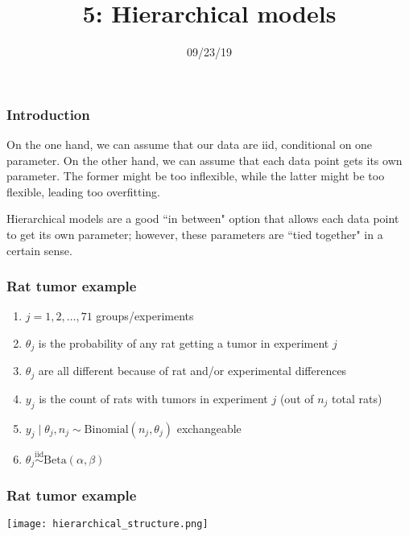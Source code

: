 \documentclass{beamer}
\title["5"]{5: Hierarchical models}
\date{09/23/19}
\begin{document}

\begin{frame}
\titlepage 
\end{frame}

\begin{frame}
\frametitle{Introduction}

On the one hand, we can assume that our data are iid, conditional on one parameter. On the other hand, we can assume that each data point gets its own parameter. The former might be too inflexible, while the latter might be too flexible, leading too overfitting.
\newline

Hierarchical models are a good ``in between" option that allows each data point to get its own parameter; however, these parameters are ``tied together" in a certain sense.

\end{frame}

\begin{frame}
\frametitle{Rat tumor example}

\begin{enumerate}
\item $j=1,2,\ldots,71$ groups/experiments
\item $\theta_j$ is the probability of any rat getting a tumor in experiment $j$
\item $\theta_j$ are all different because of rat and/or experimental differences
\item $y_j$ is the count of rats with tumors in experiment $j$ (out of $n_j$ total rats)
\item $y_j \mid \theta_j, n_j \sim \text{Binomial}(n_j, \theta_j)$ exchangeable
\item $\theta_j \overset{\text{iid}}{\sim} \text{Beta}(\alpha,\beta)$ 
\end{enumerate}

\end{frame}

\begin{frame}
\frametitle{Rat tumor example}

\begin{center}
\texttt{[image: hierarchical\_structure.png]}
\end{center}

\end{frame}
\end{document}

